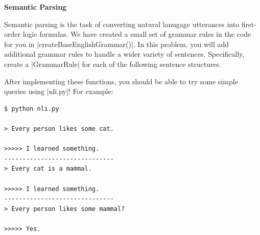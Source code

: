 \item {\bf Semantic Parsing}

Semantic parsing is the task of converting natural lanugage utterances into
first-order logic formulas. We have created a small set of grammar rules in the
code for you in |createBaseEnglishGrammar()|. In this problem, you will add
additional grammar rules to handle a wider variety of sentences. Specifically,
create a |GrammarRule| for each of the following sentence structures.

\begin{enumerate}

  

  

  

\end{enumerate}

After implementing these functions, you should be able to try some simple
queries using |nli.py|! For example:
\begin{lstlisting}
$ python nli.py

> Every person likes some cat.

>>>>> I learned something.
------------------------------
> Every cat is a mammal.

>>>>> I learned something.
------------------------------
> Every person likes some mammal?

>>>>> Yes.
\end{lstlisting}
